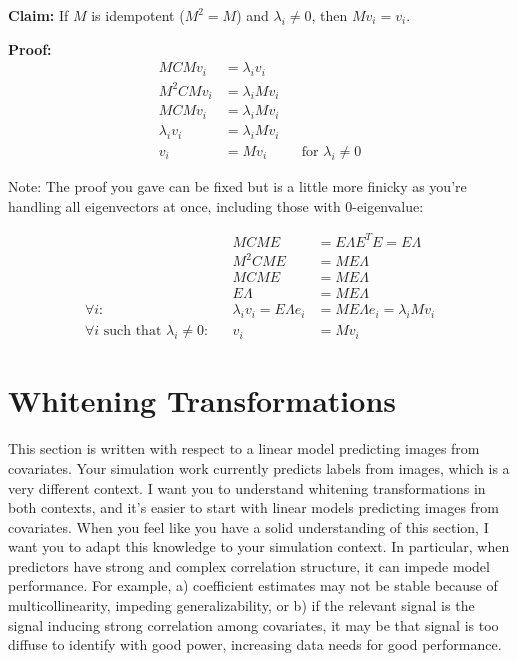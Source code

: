 \documentclass[12pt]{article}
\begin{document}
{\bf Claim:} If $M$ is idempotent ($M^2=M$) and $\lambda_i\neq 0$, then $Mv_i=v_i$.

{\bf Proof:} 
\begin{align*}
	MCMv_i & =\lambda_i v_i\\
	M^2CMv_i & =\lambda_i Mv_i\\
	MCMv_i & =\lambda_i Mv_i\\
	\lambda_i v_i & =\lambda_i Mv_i\\
	v_i & =Mv_i & & \text{for }\lambda_i\neq 0
\end{align*}

Note: The proof you gave can be fixed but is a little more finicky as you're handling all eigenvectors at once, including those with 0-eigenvalue:

\begin{align*}
	& & MCME & =E\Lambda E^T E=E\Lambda\\
	& & M^2CME & =ME\Lambda\\
	& & MCME & =ME\Lambda\\
	& & E\Lambda & =ME\Lambda\\
	\forall i:& &  \lambda_i v_i=E\Lambda e_i & =ME\Lambda e_i=\lambda_i Mv_i\\
	\forall i\text{ such that }\lambda_i\neq 0: & & v_i & =Mv_i
\end{align*}

\clearpage

\section*{Whitening Transformations}

This section is written with respect to a linear model predicting images from covariates. Your simulation work currently predicts labels from images, which is a very different context. I want you to understand whitening transformations in both contexts, and it's easier to start with linear models predicting images from covariates. When you feel like you have a solid understanding of this section, I want you to adapt this knowledge to your simulation context. In particular, when predictors have strong and complex correlation structure, it can impede model performance. For example, a) coefficient estimates may not be stable because of multicollinearity, impeding generalizability, or b) if the relevant signal is the signal inducing strong correlation among covariates, it may be that signal is too diffuse to identify with good power, increasing data needs for good performance. 
\end{document}
